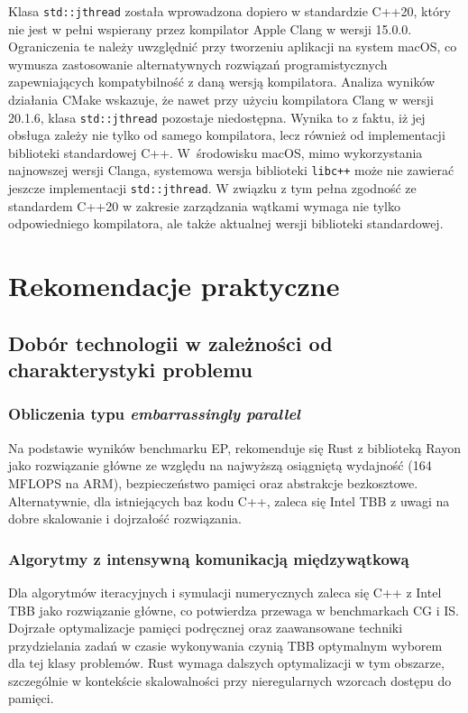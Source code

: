 Klasa \texttt{std::jthread} została wprowadzona dopiero w standardzie C++20, który nie jest w pełni wspierany przez kompilator Apple Clang w wersji 15.0.0. Ograniczenia te należy uwzględnić przy tworzeniu aplikacji na system macOS, co wymusza zastosowanie alternatywnych rozwiązań programistycznych zapewniających kompatybilność z daną wersją kompilatora. Analiza wyników działania CMake wskazuje, że nawet przy użyciu kompilatora Clang w wersji 20.1.6, klasa \texttt{std::jthread} pozostaje niedostępna. Wynika to z faktu, iż jej obsługa zależy nie tylko od samego kompilatora, lecz również od implementacji biblioteki standardowej C++. W~środowisku macOS, mimo wykorzystania najnowszej wersji Clanga, systemowa wersja biblioteki \texttt{libc++} może nie zawierać jeszcze implementacji \texttt{std::jthread}. W związku z tym pełna zgodność ze standardem C++20 w zakresie zarządzania wątkami wymaga nie tylko odpowiedniego kompilatora, ale także aktualnej wersji biblioteki standardowej.

\section{Rekomendacje praktyczne}

\subsection{Dobór technologii w zależności od charakterystyki problemu}

\subsubsection{Obliczenia typu \emph{embarrassingly parallel}}

Na podstawie wyników benchmarku EP, rekomenduje się Rust z biblioteką Rayon jako rozwiązanie główne ze względu na najwyższą osiągniętą wydajność (164 MFLOPS na ARM), bezpieczeństwo pamięci oraz abstrakcje bezkosztowe. Alternatywnie, dla istniejących baz kodu C++, zaleca się Intel TBB z uwagi na dobre skalowanie i dojrzałość rozwiązania.

\subsubsection{Algorytmy z intensywną komunikacją międzywątkową}

Dla algorytmów iteracyjnych i symulacji numerycznych zaleca się C++ z Intel TBB jako rozwiązanie główne, co potwierdza przewaga w benchmarkach CG i IS. Dojrzałe optymalizacje pamięci podręcznej oraz zaawansowane techniki przydzielania zadań w czasie wykonywania czynią TBB optymalnym wyborem dla tej klasy problemów. Rust wymaga dalszych optymalizacji w tym obszarze, szczególnie w kontekście skalowalności przy nieregularnych wzorcach dostępu do pamięci.

